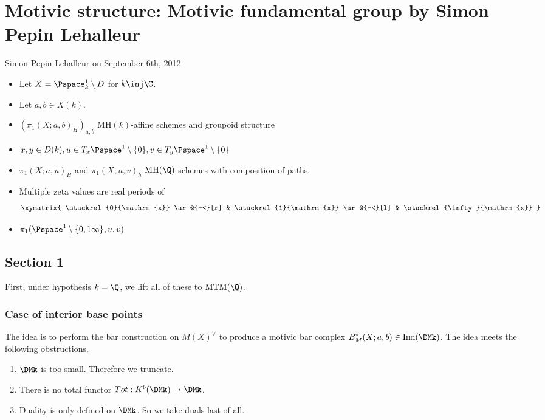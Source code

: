 \chapter{Motivic structure: Motivic fundamental group by Simon Pepin Lehalleur}

Simon Pepin Lehalleur on September 6th, 2012.

\medskip
\medskip

\begin{itemize}
\item Let $X = \Pspace^1_k \setminus D$ for $k \inj \C$. 
\item Let $a, b \in X(k)$.
\item $(\pi_1(X;a,b)_H)_{a,b}$ $\mathrm{MH}(k)$-affine schemes and groupoid structure
\item $x, y \in D(k), u \in T_x \Pspace^1 \setminus \{0\}, v \in T_y \Pspace^1 \setminus \{0\}$
\item $\pi_1(X;a,u)_H$ and $\pi_1(X;u,v)_h$ $\mathrm{MH}(\Q)$-schemes with composition of paths.
\item Multiple zeta values are real periods of
\[
\xymatrix{
\stackrel{0}{\mathrm{x}} \ar@{-<}[r] & \stackrel{1}{\mathrm{x}} \ar@{-<}[l] & \stackrel{\infty}{\mathrm{x}}
}
\]
\item $\pi_1(\Pspace^1 \setminus \{ 0,1\infty\},u,v)$
\end{itemize}

\section{Section 1}
First, under hypothesis $k=\Q$, we lift all of these to $\mathrm{MTM}(\Q)$.

\subsection{Case of interior base points}

The idea is to perform the bar construction on $M(X)^{\vee}$ to produce a motivic bar complex $B_M^*(X;a,b) \in \mathrm{Ind}(\DMk)$. The idea meets the following obstructions.
\begin{enumerate}
\item $\DMk$ is too small. Therefore we truncate.
\item There is no total functor $Tot : K^b(\DMk) \to \DMk$.
\item Duality is only defined on $\DMk$. So we take duals last of all.
\end{enumerate}

